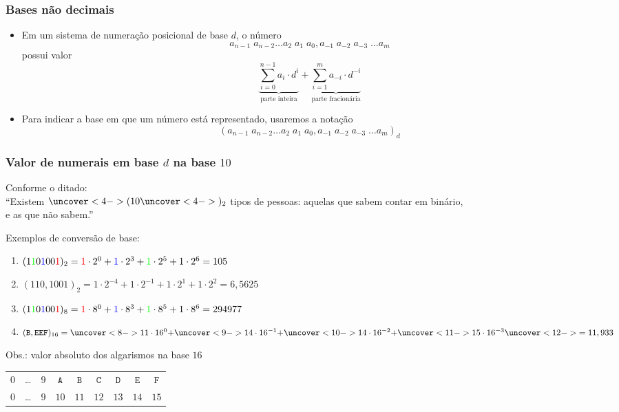 \documentclass{beamer}
\begin{document}
\begin{frame}
\frametitle{Bases não decimais}

\begin{itemize}
\item Em um sistema de numeração posicional de base $d$, o número
\[
a_{n-1} \; a_{n-2} \ldots a_2 \; a_1 \; a_0 , a_{-1} \; a_{-2} \; a_{-3} \; \ldots a_{m}
\]
possui valor
\[
    \underbrace{\sum_{i = 0}^{n-1} a_i \cdot d^i}_{\text{parte inteira}} + \underbrace{\sum_{i = 1}^{m} a_{-i} \cdot d^{-i}}_{\text{parte fracionária}}
\]
\pause
\item Para indicar a base em que um número está representado, usaremos a notação
\[
(a_{n-1} \; a_{n-2} \ldots a_2 \; a_1 \; a_0 , a_{-1} \; a_{-2} \; a_{-3} \; \ldots a_{m})_{d}
\]
\end{itemize}

\end{frame}

\begin{frame}
\frametitle{Valor de numerais em base $d$ na base $10$}

Conforme o ditado:\\
``Existem $\uncover<4->{(}10\uncover<4->{)_2}$ tipos de pessoas: \pause aquelas que sabem contar em binário,\\ \pause e as que não sabem.'' \pause

\vspace{12pt}

Exemplos de conversão de base:

\begin{enumerate}
\item $(1{\color{green}1}0{\color{blue}1}00{\color{red}1})_2 = {\color{red}1} \cdot 2^0 + {\color{blue}1} \cdot 2^3 + {\color{green}1} \cdot 2^5 + 1 \cdot 2^6 = 105$
\pause
\item $(110,1001)_2 = 1\cdot2^{-4} + 1\cdot2^{-1} + 1\cdot2^{1} + 1\cdot2^{2} = 6,5625$
\pause
\item $(1{\color{green}1}0{\color{blue}1}00{\color{red}1})_8 = {\color{red}1} \cdot 8^0 + {\color{blue}1} \cdot 8^3 + {\color{green}1} \cdot 8^5 + 1 \cdot 8^6 = 294977$
\pause
\item $(\texttt{B},\texttt{EEF})_{16} = \uncover<8->{11\cdot16^0 +}\uncover<9->{ 14\cdot16^{-1} +}\uncover<10->{ 14\cdot16^{-2} +}\uncover<11->{ 15\cdot16^{-3}}\uncover<12->{ = 11,933}$
\end{enumerate}

Obs.: valor absoluto dos algarismos na base $16$
\begin{tabular}{ccccccccc}
$0$ & \ldots & $9$ & $\texttt{A}$ & $\texttt{B}$ & $\texttt{C}$ & $\texttt{D}$ & $\texttt{E}$ & $\texttt{F}$\\
$0$ & \ldots & $9$ & $10$ & $11$ & $12$ & $13$ & $14$ & $15$
\end{tabular}

\vspace{6pt}

\end{frame}
\end{document}
